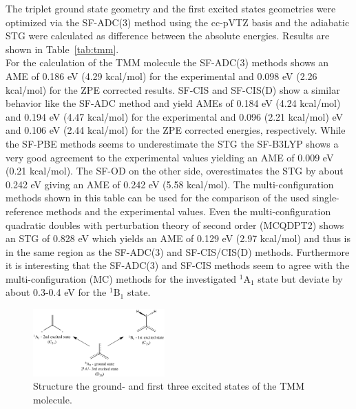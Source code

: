 \documentclass[aip,graphicx,amsmath,reprint]{revtex4-1}
\begin{document}
The triplet ground state geometry and the first excited states geometries were optimized via the SF-ADC(3) method using the cc-pVTZ basis and the adiabatic STG were calculated as difference between the absolute energies. Results are shown in Table~\ref{tab:tmm}.
\\
For the calculation of the TMM molecule the SF-ADC(3) methods shows an AME of 0.186 eV (4.29 kcal/mol) for the experimental and 0.098 eV (2.26 kcal/mol) for the ZPE corrected results. SF-CIS and SF-CIS(D) show a similar behavior like the SF-ADC method and yield AMEs of 0.184 eV (4.24 kcal/mol) and 0.194 eV (4.47 kcal/mol) for the experimental and 0.096 (2.21 kcal/mol) eV and 0.106 eV (2.44 kcal/mol) for the ZPE corrected energies, respectively. While the SF-PBE methods seems to underestimate the STG the SF-B3LYP shows a very good agreement to the experimental values yielding an AME of 0.009 eV (0.21 kcal/mol). The SF-OD on the other side, overestimates the STG by about 0.242 eV giving an AME of 0.242 eV (5.58 kcal/mol). The multi-configuration methods shown in this table can be used for the comparison of the used single-reference methods and the experimental values. Even the multi-configuration quadratic doubles with perturbation theory of second order (MCQDPT2) shows an STG of 0.828 eV which yields an AME of 0.129 eV (2.97 kcal/mol) and thus is in the same region as the SF-ADC(3) and SF-CIS/CIS(D) methods. Furthermore it is interesting that the SF-ADC(3) and SF-CIS methods seem to agree with the multi-configuration (MC) methods for the investigated $^1$A$_1$ state but deviate by about 0.3-0.4 eV for the $^1$B$_1$ state.
\begin{figure}[h!]
\includegraphics[width=0.45\textwidth]{tmm.png}
\caption{\label{fig:tmm}Structure the ground- and first three excited states of the TMM molecule.}
\end{figure}
\end{document}
